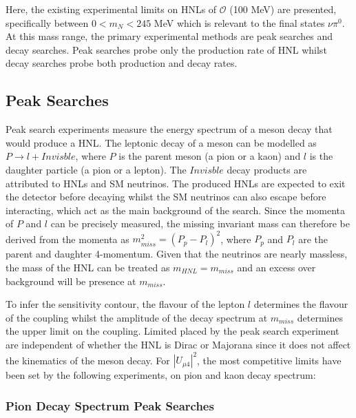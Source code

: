 Here, the existing experimental limits on HNLs of $\mathcal{O}$ (100 MeV) are presented, specifically between $ 0 < m_{N} < 245 $ MeV which is relevant to the final states $\nu\pi^{0}$.
At this mass range, the primary experimental methods are peak searches and decay searches.
Peak searches probe only the production rate of HNL whilst decay searches probe both production and decay rates.

\subsection{Peak Searches}

Peak search experiments measure the energy spectrum of a meson decay that would produce a HNL. 
The leptonic decay of a meson can be modelled as $P\rightarrow l + Invisble$, where $P$ is the parent meson (a pion or a kaon) and $l$ is the daughter particle (a pion or a lepton).
The $Invisble$ decay products are attributed to HNLs and SM neutrinos.
The produced HNLs are expected to exit the detector before decaying whilst the SM neutrinos can also escape before interacting, which act as the main background of the search.
Since the momenta of $P$ and $l$ can be precisely measured, the missing invariant mass can therefore be derived from the momenta as $m^{2}_{miss} = (P_{p} - P_{l})^{2}$, where $P_{p}$ and $P_{l}$ are the parent and daughter 4-momentum.
Given that the neutrinos are nearly massless, the mass of the HNL can be treated as $m_{HNL} = m_{miss}$ and an excess over background will be presence at $m_{miss}$.

To infer the sensitivity contour, the flavour of the lepton $l$ determines the flavour of the coupling whilst the amplitude of the decay spectrum at $m_{miss}$ determines the upper limit on the coupling.
Limited placed by the peak search experiment are independent of whether the HNL is Dirac or Majorana since it does not affect the kinematics of the meson decay.
For $|U_{\mu4}|^{2}$, the most competitive limits have been set by the following experiments, on pion and kaon decay spectrum:


\subsubsection{Pion Decay Spectrum Peak Searches}

